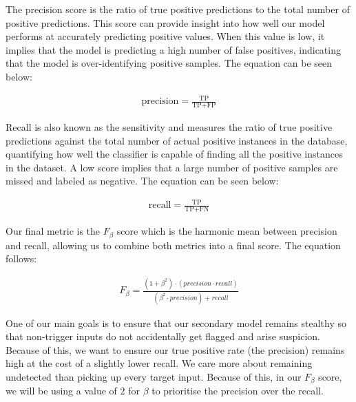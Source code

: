 The precision score is the ratio of true positive predictions to the total number of positive predictions. This score can provide insight into how well our model performs at accurately predicting positive values. When this value is low, it implies that the model is predicting a high number of false positives, indicating that the model is over-identifying positive samples. The equation can be seen below:

\begin{equation}
    \begin{gathered}
        \text{precision} = \frac{\text{TP}}{\text{TP} + \text{FP}}
    \end{gathered}
    \label{eq:precision}
\end{equation}

Recall is also known as the sensitivity and measures the ratio of true positive predictions against the total number of actual positive instances in the database, quantifying how well the classifier is capable of finding all the positive instances in the dataset. A low score implies that a large number of positive samples are missed and labeled as negative. The equation can be seen below:

\begin{equation}
    \begin{gathered}
        \text{recall} = \frac{\text{TP}}{\text{TP} + \text{FN}}
    \end{gathered}
    \label{eq:recall}
\end{equation}

Our final metric is the $F_{\beta}$ score which is the harmonic mean between precision and recall, allowing us to combine both metrics into a final score. The equation follows:

\begin{equation}
    \begin{gathered}
        F_{\beta} = \frac{{(1 + \beta^2) \cdot (precision \cdot recall)}}{{(\beta^2 \cdot precision) + recall}}
    \end{gathered}
    \label{eq:f_beta}
\end{equation}

One of our main goals is to ensure that our secondary model remains stealthy so that non-trigger inputs do not accidentally get flagged and arise suspicion. Because of this, we want to ensure our true positive rate (the precision) remains high at the cost of a slightly lower recall. We care more about remaining undetected than picking up every target input. Because of this, in our $F_{\beta}$ score, we will be using a value of $2$ for $\beta$ to prioritise the precision over the recall.

